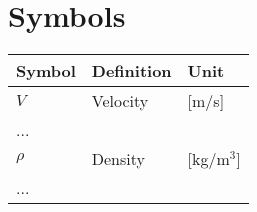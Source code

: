 \section*{Symbols}

\begin{longtable}{p{2.5cm}p{8cm}p{2.5cm}}
    \toprule
    Symbol & Definition & Unit \\
    \midrule\endhead %
    $V$ & Velocity & [m/s] \\
    ... \\
    \midrule %
    $\rho$ & Density & [kg/m$^3$] \\
    ... \\
    \bottomrule
\end{longtable}
